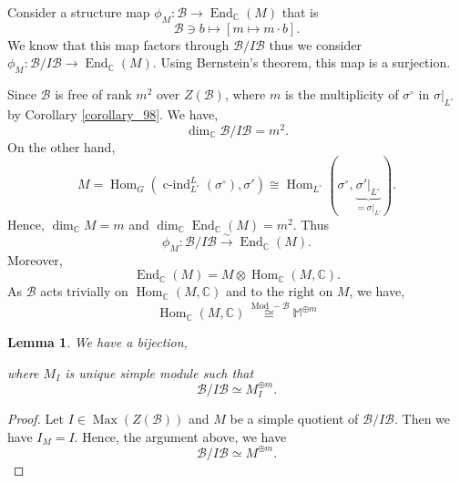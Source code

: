 \documentclass[8pt]{article}
\newtheorem{lemma}{Lemma}[section]
\DeclareMathOperator{\cind}{c-ind}
\DeclareMathOperator{\Hom}{Hom}
\DeclareMathOperator{\End}{End}
\DeclareMathOperator{\Mod}{Mod}
\DeclareMathOperator{\Irr}{Irr}
\DeclareMathOperator{\Max}{Max}
\newcommand{\C}[0]{\mathbb{C}}
\newcommand{\M}[0]{\mathbb{M}}
\newcommand{\cB}{\mathcal{B}}
\begin{document}
Consider a structure map $\phi_M:\cB\to\End_\C(M)$ that is 
\begin{equation*}
  \cB\ni b\mapsto [m\mapsto m\cdot b].
\end{equation*}
We know that this map factors through $\cB/I\cB$ thus we consider $\phi_M:\cB/I\cB\to \End_\C(M)$. Using Bernstein's theorem, this map is a surjection.
\par Since $\cB$ is free of rank $m^2$ over $Z(\cB)$, where $m$ is the multiplicity of $\sigma^\circ$ in $\sigma|_{L^\circ}$ by Corollary \ref{corollary_98}. We have,
\begin{equation*}
  \dim_\C\cB/I\cB = m^2.
\end{equation*}
On the other hand,
\begin{equation*}
  M = \Hom_G(\cind_{L^\circ}^L(\sigma^\circ),\sigma') \cong \Hom_{L^\circ}(\sigma^\circ,\underbrace{\sigma'|_{L^\circ}}_{=\sigma|_{L^\circ}}).
\end{equation*}
Hence, $\dim_\C M = m$ and $\dim_\C\End_\C(M)=m^2$. Thus 
\begin{equation*}
  \phi_M:\cB/I\cB \stackrel{\sim}{\to}\End_{\C}(M).
\end{equation*}
Moreover, 
\begin{equation*}
  \End_{\C}(M) = M\otimes \Hom_{\C}(M,\C).
\end{equation*}
As $\cB$ acts trivially on $\Hom_{\C}(M,\C)$ and to the right on $M$, we have,
\begin{equation*}
  \Hom_{\C}(M,\C)\stackrel{\Mod-\cB}{\cong} \M^{\oplus m}
\end{equation*}
\begin{lemma}
  \label{lemma_107}
  We have a bijection,
  \begin{center}
  \end{center}
  where $M_I$ is unique simple module such that 
  \begin{equation*}
    \cB/I\cB \simeq M_I^{\oplus m}.
  \end{equation*}
\end{lemma}
\begin{proof}
Let $I\in\Max(Z(\cB))$ and $M$ be a simple quotient of $\cB/I\cB$. Then we have $I_M = I$. Hence, the argument above, we have
\begin{equation*}
  \cB/I\cB\simeq M^{\oplus m}.
\end{equation*}
\end{proof}
\end{document}
